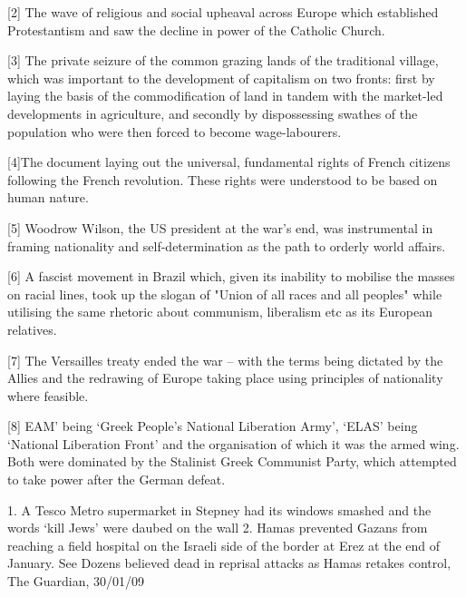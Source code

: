 [2] The wave of religious and social upheaval across Europe which established Protestantism and saw the decline in power of the Catholic Church.

[3] The private seizure of the common grazing lands of the traditional village, which was important to the development of capitalism on two fronts: first by laying the basis of the commodification of land in tandem with the market-led developments in agriculture, and secondly by dispossessing swathes of the population who were then forced to become wage-labourers.

[4]The document laying out the universal, fundamental rights of French citizens following the French revolution. These rights were understood to be based on human nature.

[5] Woodrow Wilson, the US president at the war’s end, was instrumental in framing nationality and self-determination as the path to orderly world affairs.

[6] A fascist movement in Brazil which, given its inability to mobilise the masses on racial lines, took up the slogan of "Union of all races and all peoples" while utilising the same rhetoric about communism, liberalism etc as its European relatives.

[7] The Versailles treaty ended the war – with the terms being dictated by the Allies and the redrawing of Europe taking place using principles of nationality where feasible.

[8] EAM’ being ‘Greek People’s National Liberation Army’, ‘ELAS’ being ‘National Liberation Front’ and the organisation of which it was the armed wing. Both were dominated by the Stalinist Greek Communist Party, which attempted to take power after the German defeat.

    1. A Tesco Metro supermarket in Stepney had its windows smashed and the words ‘kill Jews’ were daubed on the wall
    2. Hamas prevented Gazans from reaching a field hospital on the Israeli side of the border at Erez at the end of January. See Dozens believed dead in reprisal attacks as Hamas retakes control, The Guardian, 30/01/09 

